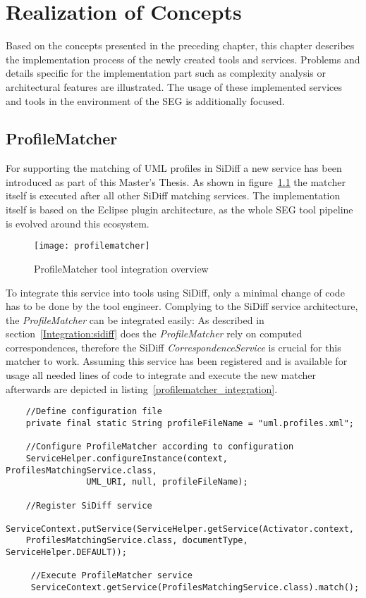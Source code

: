 \chapter{Realization of Concepts}\label{realization}
Based on the concepts presented in the preceding chapter, this chapter
describes the implementation process of the newly created tools and services.
Problems and details specific for the implementation part such as complexity
analysis or architectural features are illustrated. The usage of these
implemented services and tools in the environment of the \ac{SEG} is
additionally focused.
\section{ProfileMatcher}\label{realization:profilematcher}
For supporting the matching of \ac{UML} profiles in SiDiff a new service
has been introduced as part of this Master's Thesis. As shown in
figure~\ref{profilematcher} the matcher itself is executed after all other
SiDiff matching services. The implementation itself is based on the Eclipse
plugin architecture, as the whole \ac{SEG} tool pipeline is evolved around this
ecosystem.

 \begin{figure}[h!]
\begin{center}
\texttt{[image: profilematcher]}\\
\end{center}
\caption{ProfileMatcher tool integration overview}
\label{profilematcher}
\end{figure}
\newpage

To integrate this service into tools using SiDiff, only a minimal change of code
has to be done by the tool engineer. Complying to the SiDiff service
architecture, the \textit{ProfileMatcher} can be integrated easily:
As described in section~\ref{Integration:sidiff} does the \textit{ProfileMatcher} rely on
computed correspondences, therefore the SiDiff \textit{CorrespondenceService} is
crucial for this matcher to work. Assuming this service has been registered
and is available for usage all needed lines of code to integrate and execute the
new matcher afterwards are depicted in listing~\ref{profilematcher_integration}.
    \begin{lstlisting}
    //Define configuration file
    private final static String profileFileName = "uml.profiles.xml";
   
    //Configure ProfileMatcher according to configuration
    ServiceHelper.configureInstance(context, ProfilesMatchingService.class,
				UML_URI, null, profileFileName);
				
    //Register SiDiff service
  	ServiceContext.putService(ServiceHelper.getService(Activator.context,
  	ProfilesMatchingService.class, documentType, ServiceHelper.DEFAULT));
					
 	 //Execute ProfileMatcher service					
	 ServiceContext.getService(ProfilesMatchingService.class).match();\end{lstlisting}

